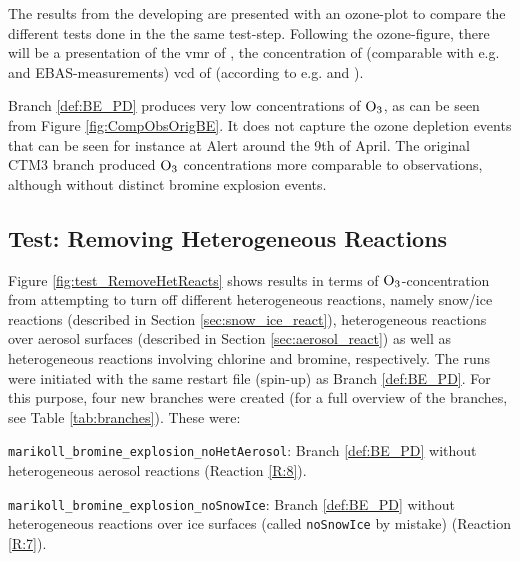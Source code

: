 The results from the developing are presented with an ozone-plot to compare the different tests done in the the same test-step. Following the ozone-figure, there will be a presentation of the \acrlong{vmr} of , the concentration of  (comparable with e.g. \cite{barrie} and EBAS-measurements) \acrlong{vcd} of  (according to e.g. \cite{Peterson2015} and \cite{Simpson2017}).

\medskip

Branch \ref{def:BE_PD} produces very low concentrations of $\mathrm{O_3}$, as can be seen from Figure \ref{fig:CompObsOrigBE}. It does not capture the ozone depletion events that can be seen for instance at Alert around the 9th of April. The original CTM3 branch produced $\mathrm{O_3}$ concentrations more comparable to observations, although without distinct bromine explosion events. 





\subsection{Test: Removing Heterogeneous Reactions}

Figure \ref{fig:test_RemoveHetReacts} shows results in terms of $\mathrm{O_3}$-concentration from attempting to turn off different heterogeneous reactions, namely snow/ice reactions (described in Section \ref{sec:snow_ice_react}), heterogeneous reactions over aerosol surfaces (described in Section \ref{sec:aerosol_react}) as well as heterogeneous reactions involving chlorine and bromine, respectively. The runs were initiated with the same restart file (spin-up) as Branch \ref{def:BE_PD}. For this purpose, four new branches were created (for a full overview of the branches, see Table \ref{tab:branches}). These were:

\begin{mydef}\label{def:BE_PD_noAerosol}
    \texttt{marikoll\_bromine\_explosion\_noHetAerosol}: Branch \ref{def:BE_PD} without heterogeneous aerosol reactions (Reaction \ref{R:8}). 
\end{mydef}

\begin{mydef}\label{def:BE_PD_noIce}
    \texttt{marikoll\_bromine\_explosion\_noSnowIce}: Branch \ref{def:BE_PD} without heterogeneous reactions over ice surfaces (called \texttt{noSnowIce} by mistake) (Reaction \ref{R:7}).
\end{mydef}

